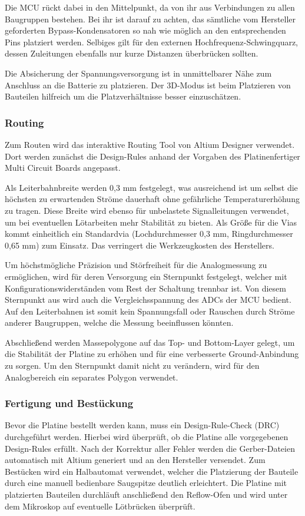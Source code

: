 Die MCU rückt dabei in den Mittelpunkt, da von ihr aus Verbindungen zu allen Baugruppen bestehen. Bei ihr ist darauf zu achten, das sämtliche vom Hersteller geforderten Bypass-Kondensatoren so nah wie möglich an den entsprechenden Pins platziert werden. Selbiges gilt für den externen Hochfrequenz-Schwingquarz, dessen Zuleitungen ebenfalls nur kurze Distanzen überbrücken sollten.

Die Absicherung der Spannungsversorgung ist in unmittelbarer Nähe zum Anschluss an die Batterie zu platzieren. Der 3D-Modus ist beim Platzieren von Bauteilen hilfreich um die Platzverhältnisse besser einzuschätzen.


\subsubsection{Routing}
Zum Routen wird das interaktive Routing Tool von Altium Designer verwendet. Dort werden zunächst die Design-Rules anhand der Vorgaben des Platinenfertiger Multi Circuit Boards angepasst.

Als Leiterbahnbreite werden 0,3 mm festgelegt, was ausreichend ist um selbst die höchsten zu erwartenden Ströme dauerhaft ohne gefährliche Temperaturerhöhung zu tragen. Diese Breite wird ebenso für unbelastete Signalleitungen verwendet, um bei eventuellen Lötarbeiten mehr Stabilität zu bieten. Als Größe für die Vias kommt einheitlich ein Standardvia (Lochdurchmesser 0,3 mm, Ringdurchmesser 0,65 mm) zum Einsatz. Das verringert die Werkzeugkosten des Herstellers. %

Um höchstmögliche Präzision und Störfreiheit für die Analogmessung zu ermöglichen, wird für deren Versorgung ein Sternpunkt festgelegt, welcher mit Konfigurationswiderständen vom Rest der Schaltung trennbar ist. Von diesem Sternpunkt aus wird auch die Vergleichsspannung des ADCs der MCU bedient. Auf den Leiterbahnen ist somit kein Spannungsfall oder Rauschen durch Ströme anderer Baugruppen, welche die Messung beeinflussen könnten. 

Abschließend werden Massepolygone auf das Top- und Bottom-Layer gelegt, um die Stabilität der Platine zu erhöhen und für eine verbesserte Ground-Anbindung zu sorgen. Um den Sternpunkt damit nicht zu verändern, wird für den Analogbereich ein separates Polygon verwendet.



\subsubsection{Fertigung und Bestückung}
Bevor die Platine bestellt werden kann, muss ein Design-Rule-Check (DRC) durchgeführt werden. Hierbei wird überprüft, ob die Platine alle vorgegebenen Design-Rules erfüllt. Nach der Korrektur aller Fehler werden die Gerber-Dateien automatisch mit Altium generiert und an den Hersteller versendet.
Zum Bestücken wird ein Halbautomat verwendet, welcher die Platzierung der Bauteile durch eine manuell bedienbare Saugspitze deutlich erleichtert. Die Platine mit platzierten Bauteilen durchläuft anschließend den Reflow-Ofen und wird unter dem Mikroskop auf eventuelle Lötbrücken überprüft.

